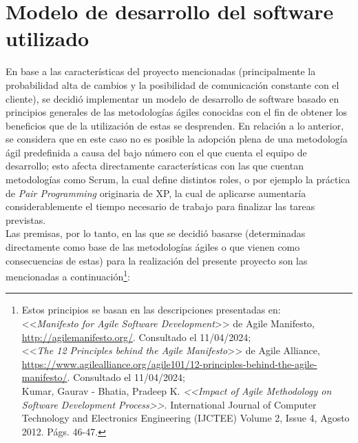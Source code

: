 \documentclass[a4paper, 12pt,twoside]{report}  %
\numberwithin{equation}{subsection} %
\begin{document}
\section{Modelo de desarrollo del software utilizado}
\label{Modelo de desarrollo del software utilizado}
En base a las características del proyecto mencionadas (principalmente la probabilidad alta de cambios y la posibilidad de comunicación constante con el cliente), se decidió implementar un modelo de desarrollo de software basado en principios generales de las metodologías ágiles conocidas con el fin de obtener los beneficios que de la utilización de estas se desprenden. En relación a lo anterior, se considera que en este caso no es posible la adopción plena de una metodología ágil predefinida a causa del bajo número con el que cuenta el equipo de desarrollo; esto afecta directamente características con las que cuentan metodologías como Scrum, la cual define distintos roles, o por ejemplo la práctica de \textit{Pair Programming} originaria de XP, la cual de aplicarse aumentaría considerablemente el tiempo necesario de trabajo para finalizar las tareas previstas.\\
\indent Las premisas, por lo tanto, en las que se decidió basarse (determinadas directamente como base de las metodologías ágiles o que vienen como consecuencias de estas) para la realización del presente proyecto son las mencionadas a continuación\footnote{Estos principios se basan en las descripciones presentadas en:\\ \indent <<\textit{Manifesto for Agile Software Development}>> de Agile Manifesto, \url{http://agilemanifesto.org/}. Consultado el 11/04/2024;\\ \indent <<\textit{The 12 Principles behind the Agile Manifesto}>> de Agile Alliance, \url{https://www.agilealliance.org/agile101/12-principles-behind-the-agile-manifesto/}. Consultado el 11/04/2024;\\
	\indent Kumar, Gaurav - Bhatia, Pradeep K. \textit{<<Impact of Agile Methodology on Software Development Process>>}. International Journal of Computer Technology and Electronics Engineering (IJCTEE)
	Volume 2, Issue 4, Agosto 2012. Págs. 46-47.}:
\end{document}
